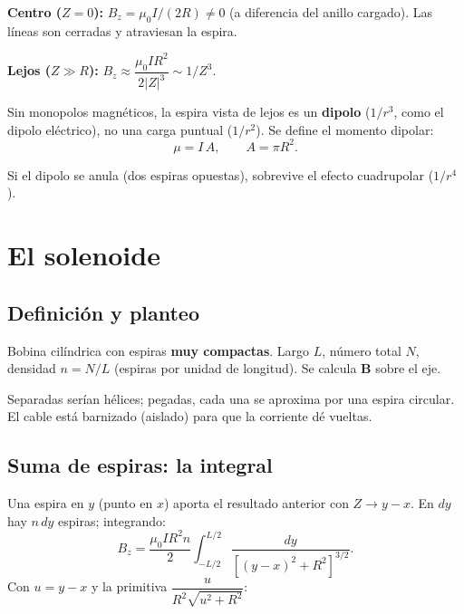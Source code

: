 \documentclass[12pt,a4paper]{article}
\begin{document}
\textbf{Centro ($Z=0$):} $B_z = \mu_0 I/(2R) \neq 0$ (a diferencia del
anillo cargado). Las líneas son cerradas y atraviesan la espira.

\textbf{Lejos ($Z\gg R$):} $B_z \approx \dfrac{\mu_0 I R^2}{2|Z|^3} \sim
1/Z^3$.

\begin{keybox}
  Sin monopolos magnéticos, la espira vista de lejos es un \textbf{dipolo}
  ($1/r^3$, como el dipolo eléctrico), no una carga puntual ($1/r^2$). Se
  define el momento dipolar:
  \[
  \boxed{\mu = I\,A}, \qquad A = \pi R^2.
  \]
\end{keybox}

\begin{notebox}[Cuadrupolo]
  Si el dipolo se anula (dos espiras opuestas), sobrevive el efecto
  cuadrupolar ($1/r^4$).
\end{notebox}



\section{El solenoide}

\subsection{Definición y planteo}

Bobina cilíndrica con espiras \textbf{muy compactas}. Largo $L$, número
total $N$, densidad $n = N/L$ (espiras por unidad de longitud). Se calcula
$\mathbf{B}$ sobre el eje.


\begin{notebox}
  Separadas serían hélices; pegadas, cada una se aproxima por una espira
  circular. El cable está barnizado (aislado) para que la corriente dé
  vueltas.
\end{notebox}



\subsection{Suma de espiras: la integral}

Una espira en $y$ (punto en $x$) aporta el resultado anterior con $Z \to
y-x$. En $dy$ hay $n\,dy$ espiras; integrando:
\[
B_z = \frac{\mu_0 I R^2 n}{2}\int_{-L/2}^{L/2}
      \frac{dy}{[(y-x)^2 + R^2]^{3/2}}.
\]
Con $u = y-x$ y la primitiva $\dfrac{u}{R^2\sqrt{u^2+R^2}}$:
\end{document}
